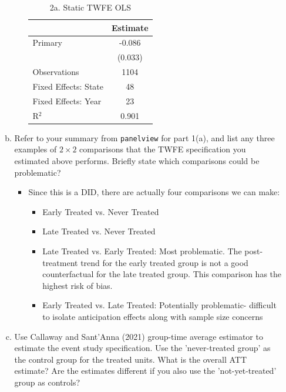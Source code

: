 \documentclass{article}
\begin{document}
\begin{enumerate}
\begin{enumerate}[(a)]
\begin{itemize}
\begin{table}[h]
            \caption*{2a. Static TWFE OLS}
            \begin{tabular}{lc}
            \hline
            \hline
            & \textbf{Estimate} \\
            \hline
            Primary & -0.086\\
            & (0.033)\\
            \hline
            Observations & 1104 \\
            Fixed Effects: State & 48\\
            Fixed Effects: Year & 23\\
            R$^2$ & 0.901 \\
            \hline
            \hline
            \end{tabular}
        \end{table}
        \end{itemize}
        \newpage
        \item Refer to your summary from \verb|panelview| for part 1(a), and list any three examples of $2 \times 2$ comparisons that the TWFE specification you estimated above performs. Briefly state which comparisons could be problematic?
        \begin{itemize}
            \item Since this is a DID, there are actually four comparisons we can make:
            \begin{itemize}
                \item Early Treated vs. Never Treated
                \item Late Treated vs. Never Treated
                \item Late Treated vs. Early Treated: Most problematic. The post-treatment trend for the early treated group is not a good counterfactual for the late treated group. This comparison has the highest risk of bias.
                \item Early Treated vs. Late Treated: Potentially problematic- difficult to isolate anticipation effects along with sample size concerns
            \end{itemize}
        \end{itemize}
        \item Use Callaway and Sant'Anna (2021) group-time average estimator to estimate the event study specification. Use the 'never-treated group' as the control group for the treated units. What is the overall ATT estimate? Are the estimates different if you also use the 'not-yet-treated' group as controls?

\end{enumerate}
\end{enumerate}
\end{document}

